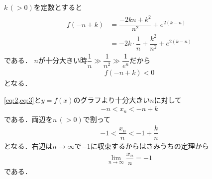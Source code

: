 \documentclass[../../main.tex]{subfiles}
\begin{document}
$k\, (>0)$を定数とすると
\begin{align}
  \begin{split}
    f(-n+k)&=\dfrac{-2kn+k^2}{n^2}+e^{2(k-n)} \\
    &=-2k\cdot\dfrac{1}{n}+\dfrac{k^2}{n^2}+e^{2(k-n)}
  \end{split}
\end{align}
である．
$n$が十分大きい時$\dfrac{1}{n}\gg\dfrac{1}{n^2}\gg\dfrac{1}{e^n}$だから
\begin{align}
  f(-n+k)<0 \label{eq:3}
\end{align}
となる．

\cref{eq:2,eq:3}と$y=f(x)$のグラフより十分大きい$n$に対して
\begin{align}
  -n<x_n<-n+k
\end{align}
である．両辺を$n\, (>0)$で割って
\begin{align}
  -1<\dfrac{x_n}{n}<-1+\dfrac{k}{n}
\end{align}
となる．右辺は$n\to\infty$で$-1$に収束するからはさみうちの定理から
\begin{align}
  \lim_{n\to\infty} \dfrac{x_n}{n} = -1
\end{align}
である．

\newpage
\end{document}
